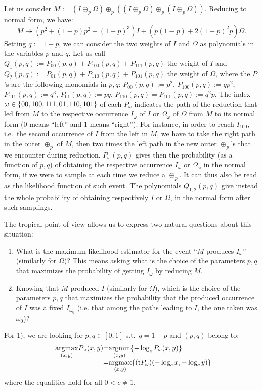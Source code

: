 Let us consider $M:=(I\oplus_p\Omega)\oplus_p((I\oplus_p\Omega)\oplus_p(I\oplus_p\Omega))$.
Reducing to normal form, we have:
\[
 M\twoheadrightarrow (p^2+(1-p)p^2+(1-p)^3)I+(p(1-p)+2(1-p)^2p)\Omega.
\]
Setting $q:=1-p$, we can consider the two weights of $I$ and $\Omega$ as polynomials in the variables $p$ and $q$.
Let us call
$Q_1(p,q):=P_{00}(p,q)+P_{100}(p,q)+P_{111}(p,q)$ the weight of $I$ and
$Q_2(p,q):=P_{01}(p,q)+P_{110}(p,q)+P_{101}(p,q)$ the weight of $\Omega$,
where the $P$'s are the following monomials in $p,q$:
$P_{00}(p,q):=p^2$,
$P_{100}(p,q):=qp^2$,
$P_{111}(p,q):=q^3$,
$P_{01}(p,q):=pq$,
$P_{110}(p,q)=P_{101}(p,q):=q^2p$.
The index $\omega\in\{00,100,111,01,110,101\}$ of each $P_\omega$ indicates the path of the reduction that led from $M$ to the respective occurrence $I_\omega$ of $I$ or $\Omega_\omega$ of $\Omega$ from $M$ to its normal form ($0$ means ``left'' and $1$ means ``right'').
For instance, in order to reach $I_{100}$, i.e.\ the second occurrence of $I$ from the left in $M$, we have to take the right path in the outer $\oplus_p$ of $M$, then two times the left path in the new outer $\oplus_p$'s that we encounter during reduction.
$P_{\omega}(p,q)$ gives then the probability (as a function of $p,q$) of obtaining the respective occurrence $I_{\omega}$ or $\Omega_\omega$ in the normal form, if we were to sample at each time we reduce a $\oplus_p$.
It can thus also be read as the likelihood function of such event.
The polynomials $Q_{1,2}(p,q)$ give instead the whole probability of obtaining respectively $I$ or $\Omega$, in the normal form after such samplings.

The tropical point of view allows us to express two natural questions about this situation:
\begin{enumerate}
 \item What is the maximum likelihood estimator for the event ``$M$ produces $I_\omega$'' (similarly for $\Omega$)?
This means asking what is the choice of the parameters $p,q$ that maximizes the probability of getting $I_\omega$ by reducing $M$.
 \item Knowing that $M$ produced $I$ (similarly for $\Omega$), which is the choice of the parameters $p,q$ that maximizes the probability that the produced occurrence of $I$ was a fixed $I_{\omega_0}$ (i.e. that among the paths leading to $I$, the one taken was $\omega_0$)?
\end{enumerate}

For 1), we are looking for $p,q\in[0,1]$ s.t.\ $q=1-p$ and $(p,q)$ belong to:
\begin{equation}
  \begin{array}{r@{}c@{}l@{}}
   \underset{(x,y)}{\RM{arg max}} P_\omega (x,y)
   & = &
   \underset{(x,y)}{\RM{arg min}}\set{-\log_c P_\omega (x,y)}
   \\
   & = &
   \underset{(x,y)}{\RM{arg max}}\set{(\trop P_\omega) (-\log_c x,-\log_c y)} \label{eq:argmax}
  \end{array}
\end{equation}
where the equalities hold for all $0<c\neq1$.

